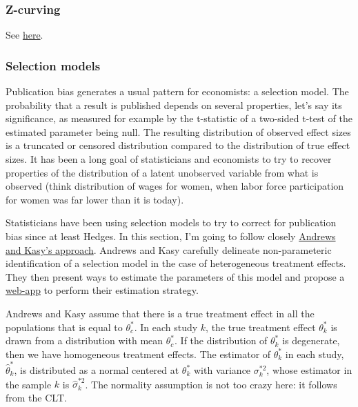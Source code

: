 \documentclass[
]{book}
\theoremstyle{definition}
\theoremstyle{definition}
\theoremstyle{definition}
\theoremstyle{definition}
\theoremstyle{remark}
\begin{document}
\hypertarget{z-curving}{%
\subsubsection{Z-curving}\label{z-curving}}

See \href{https://replicationindex.files.wordpress.com/2018/10/final-revision-874-manuscript-in-pdf-2236-1-4-20180425-mva-final-002.pdf}{here}.

\hypertarget{selection-models}{%
\subsubsection{Selection models}\label{selection-models}}

Publication bias generates a usual pattern for economists: a selection model.
The probability that a result is published depends on several properties, let's say its significance, as measured for example by the t-statistic of a two-sided t-test of the estimated parameter being null.
The resulting distribution of observed effect sizes is a truncated or censored distribution compared to the distribution of true effect sizes.
It has been a long goal of statisticians and economists to try to recover properties of the distribution of a latent unobserved variable from what is observed (think distribution of wages for women, when labor force participation for women was far lower than it is today).

Statisticians have been using selection models to try to correct for publication bias since at least Hedges.
In this section, I'm going to follow closely \href{https://www.aeaweb.org/articles?id=10.1257/aer.20180310}{Andrews and Kasy's approach}.
Andrews and Kasy carefully delineate non-parameteric identification of a selection model in the case of heterogeneous treatment effects.
They then present ways to estimate the parameters of this model and propose a \href{https://maxkasy.github.io/home/metastudy/}{web-app} to perform their estimation strategy.

Andrews and Kasy assume that there is a true treatment effect in all the populations that is equal to \(\theta^*_c\).
In each study \(k\), the true treatment effect \(\theta^*_k\) is drawn from a distribution with mean \(\theta^*_c\).
If the distribution of \(\theta^*_k\) is degenerate, then we have homogeneous treatment effects.
The estimator of \(\theta^*_k\) in each study, \(\hat{\theta}^*_k\), is distributed as a normal centered at \(\theta^*_k\) with variance \(\sigma^{*2}_k\), whose estimator in the sample \(k\) is \(\hat{\sigma}^{*2}_k\).
The normality assumption is not too crazy here: it follows from the CLT.
\end{document}
